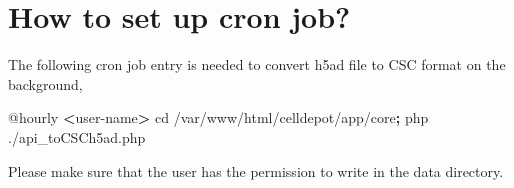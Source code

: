\documentclass[
]{book}
\newenvironment{Shaded}{\begin{snugshade}}{\end{snugshade}}
\newcommand{\ExtensionTok}[1]{#1}
\newcommand{\KeywordTok}[1]{\textcolor[rgb]{0.13,0.29,0.53}{\textbf{#1}}}
\newcommand{\NormalTok}[1]{#1}
\newcommand{\OperatorTok}[1]{\textcolor[rgb]{0.81,0.36,0.00}{\textbf{#1}}}
\begin{document}
\hypertarget{cron}{%
\section{How to set up cron job?}\label{cron}}

The following cron job entry is needed to convert h5ad file to CSC format on the background,

\begin{Shaded}
\begin{Highlighting}[]
\ExtensionTok{@hourly} \OperatorTok{\textless{}}\NormalTok{user{-}name}\OperatorTok{\textgreater{}}\NormalTok{ cd /var/www/html/celldepot/app/core}\KeywordTok{;} \ExtensionTok{php}\NormalTok{ ./api\_toCSCh5ad.php}
\end{Highlighting}
\end{Shaded}

Please make sure that the user has the permission to write in the data directory.

  
\end{document}
